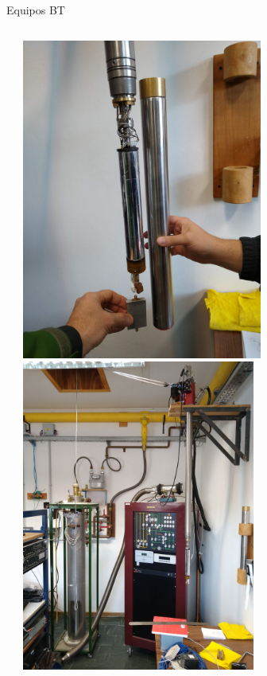 \documentclass[ignorenonframetext,12pt]{beamer}
\begin{document}
\begin{frame}{Equipos BT}
\begin{columns}
\begin{column}{0.45\textwidth}
								\end{column}
								\begin{column}{0.45\textwidth}
												\includegraphics[angle=-90, width=0.62\textwidth]{IMG_20190523_105443289} \\ 
												\includegraphics[angle=-90,width=0.6\textwidth]{IMG_20190523_105117465}
								\end{column}
				\end{columns}


\end{frame}
\end{document}

